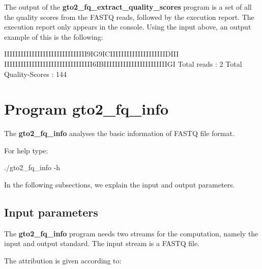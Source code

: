 \documentclass[11pt,]{krantz}
\newenvironment{Shaded}{\begin{snugshade}}{\end{snugshade}}
\newcommand{\ExtensionTok}[1]{#1}
\newcommand{\NormalTok}[1]{#1}
\begin{document}
The output of the \textbf{gto2\_fq\_extract\_quality\_scores} program is
a set of all the quality scores from the FASTQ reads, followed by the
execution report. The execution report only appears in the console.
Using the input above, an output example of this is the following:

\begin{Shaded}
\begin{Highlighting}[]
\ExtensionTok{IIIIIIIIIIIIIIIIIIIIIIIIIIIIII9IG9ICIIIIIIIIIIIIIIIIIIIIDIII}
\ExtensionTok{IIIIIIIIIIIIIIIIIIIIIIIIIIIIIIII6IBIIIIIIIIIIIIIIIIIIIIIIIGI}
\ExtensionTok{Total}\NormalTok{ reads          : 2}
\ExtensionTok{Total}\NormalTok{ Quality-Scores : 144}
\end{Highlighting}
\end{Shaded}

\section{Program gto2\_fq\_info}\label{program-gto2_fq_info}

The \textbf{gto2\_fq\_info} analyses the basic information of FASTQ file
format.

For help type:

\begin{Shaded}
\begin{Highlighting}[]
\ExtensionTok{./gto2_fq_info}\NormalTok{ -h}
\end{Highlighting}
\end{Shaded}

In the following subsections, we explain the input and output
parameters.

\subsection*{Input parameters}\label{input-parameters-4}


The \textbf{gto2\_fq\_info} program needs two streams for the
computation, namely the input and output standard. The input stream is a
FASTQ file.

The attribution is given according to:
\end{document}
